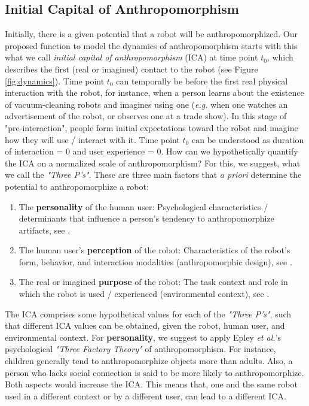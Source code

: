 \documentclass[lettersize, apacite, twoside, HRI]{apa_HRI}
\begin{document}
\subsection{Initial Capital of Anthropomorphism}
\label{sec:ica}

	Initially, there is a given potential that a robot will be anthropomorphized. Our proposed function to model the dynamics of anthropomorphism starts with this what we call \textit{initial capital of anthropomorphism} (ICA) at time point $t_{0}$, which describes the first (real or imagined) contact to the robot (see Figure \ref{fig:dynamics}). Time point $t_{0}$ can temporally be before the first real physical interaction with the robot, for instance, when a person learns about the existence of vacuum-cleaning robots and imagines using one (\textit{e.g.} when one watches an advertisement of the robot, or observes one at a trade show). In this stage of "pre-interaction", people form initial expectations toward the robot and imagine how they will use / interact with it. Time point $t_{0}$ can be understood as duration of interaction = 0 and user experience = 0. How can we hypothetically quantify the ICA on a normalized scale of anthropomorphism? For this, we suggest, what we call the \textit{"Three P's"}. These are three main factors that \textit{a priori} determine the potential to anthropomorphize a robot:
	
\begin{enumerate}

	\item The \textbf{personality} of the human user: Psychological characteristics / determinants that influence a person's tendency to anthropomorphize artifacts, see \cite{epley_seeing_2007}.
	
	\item The human user's \textbf{perception} of the robot: Characteristics of the robot's form, behavior, and interaction modalities (anthropomorphic design), see \cite{fong_survey_2003}.
	
	\item The real or imagined \textbf{purpose} of the robot: The task context and role in which the robot is used / experienced (environmental context), see \cite{joosse_what_2013}.

\end{enumerate}	

	The ICA comprises some hypothetical values for each of the \textit{"Three P's"}, such that different ICA values can be obtained, given the robot, human user, and environmental context.
	For \textbf{personality}, we suggest to apply Epley \textit{et al.}'s psychological \textit{"Three Factory Theory"} of anthropomorphism. For instance, children generally tend to anthropomorphize objects more than adults. Also, a person who lacks social connection is said to be more likely to anthropomorphize. Both aspects would increase the ICA. This means that, one and the same robot used in a different context or by a different user, can lead to a different ICA.
	
\end{document}
